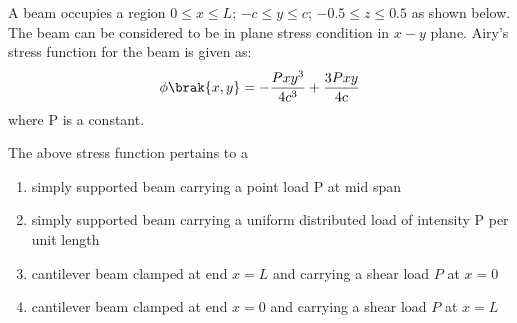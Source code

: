 \iffalse
\chapter{2008}
\author{AI24BTECH11014}
\section{ae}
\fi

\item A beam occupies a region $0\leq x \leq L$; $-c \leq y \leq c$; $ -0.5 \leq z \leq 0.5 $ as shown below. The beam can be considered to be in plane stress condition in $x-y$ plane. Airy's stress function for the beam is given as:
      \begin{align}
      \phi \brak{x, y} = -\frac{Px{y}^3}{4{c}^3}+\frac{3Pxy}{4c}
      \end{align}
      where P is a constant.

\begin{center}
\end{center}


      The above stress function pertains to a 
      \begin{enumerate}
      \item simply supported beam carrying a point load P at mid span 
      \item simply supported beam carrying a uniform distributed load of intensity P per unit length 
      \item cantilever beam clamped at end $x = L$ and carrying a shear load $P$ at $x = 0$
      \item cantilever beam clamped at end $x = 0$ and carrying a shear load $P$ at $x = L$
      \end{enumerate}

